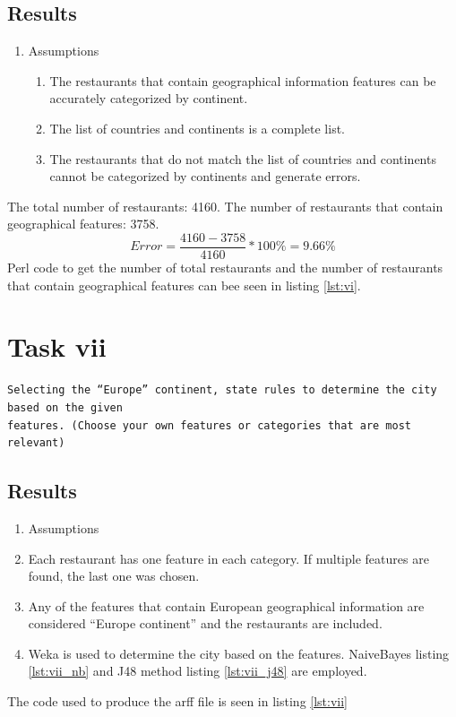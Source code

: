 \documentclass[letterpaper,10pt]{article}
\begin{document}
\subsection*{Results}
\begin{enumerate}
\item Assumptions 
\begin{enumerate}
\item The restaurants that contain geographical information features can be accurately categorized by continent.
\item The list of countries and continents is a complete list.
\item The restaurants that do not match the list of countries and continents cannot be categorized by continents and generate errors.
\end{enumerate} 
\end{enumerate}
The total number of restaurants: 4160.
The number of restaurants that contain geographical features: 3758.
$$Error=\frac{4160 - 3758}{4160} * 100\% = 9.66\%$$ 
Perl code to get the number of total restaurants and the number of restaurants that contain geographical features can bee seen in listing \hyperref[lst:vi]{\ref{lst:vi}}.
\clearpage
\newpage
{}
\section*{Task vii}
\begin{verbatim}
Selecting the “Europe” continent, state rules to determine the city based on the given
features. (Choose your own features or categories that are most relevant)
\end{verbatim}
\subsection*{Results}
\begin{enumerate}
\item[] Assumptions 
\item Each restaurant has one feature in each category. If multiple features are found, the last one was chosen.
\item Any of the features that contain European geographical information are considered “Europe continent” and the restaurants are included.
\item Weka is used to determine the city based on the features. NaiveBayes listing \hyperref[lst:vii_nb]{\ref{lst:vii_nb}} and J48 method listing \hyperref[lst:vii_j48]{\ref{lst:vii_j48}} are employed.
\end{enumerate}
The code used to produce the arff file is seen in listing \hyperref[lst:vii]{\ref{lst:vii}}

\end{document}
